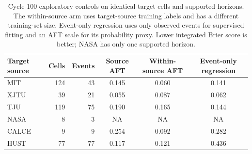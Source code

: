 \documentclass[preprint,12pt]{elsarticle}
\begin{document}
\begin{table}[htbp]
\caption{Cycle-100 source-held-out integrated IPCW Brier score (lower is better), plus XGBoost AFT Harrell C and event-only MedAPE. Each source uses its supported cycle grid; model Brier comparisons are paired within a row. NASA supports only one horizon and has no integral. Harrell C and MedAPE use different evaluation targets from Brier.}
\label{tab:main}\centering\scriptsize\setlength{\tabcolsep}{2.6pt}
\end{table}
\begin{table}[htbp]
\caption{Cycle-100 exploratory controls on identical target cells and supported horizons. The within-source arm uses target-source training labels and has a different training-set size. Event-only regression uses only observed events for supervised fitting and an AFT scale for its probability proxy. Lower integrated Brier score is better; NASA has only one supported horizon.}
\label{tab:controls}\centering\scriptsize\setlength{\tabcolsep}{4pt}
\begin{tabular}{@{}lrrccc@{}}\toprule
Target source & Cells & Events & Source AFT & Within-source AFT & Event-only regression\\\midrule
MIT & 124 & 43 & 0.145 & 0.060 & 0.141\\
XJTU & 39 & 21 & 0.055 & 0.087 & 0.062\\
TJU & 119 & 75 & 0.190 & 0.165 & 0.144\\
NASA & 8 & 3 & NA & NA & NA\\
CALCE & 9 & 9 & 0.254 & 0.092 & 0.282\\
HUST & 77 & 77 & 0.117 & 0.121 & 0.436\\\bottomrule
\end{tabular}
\end{table}
\end{document}
